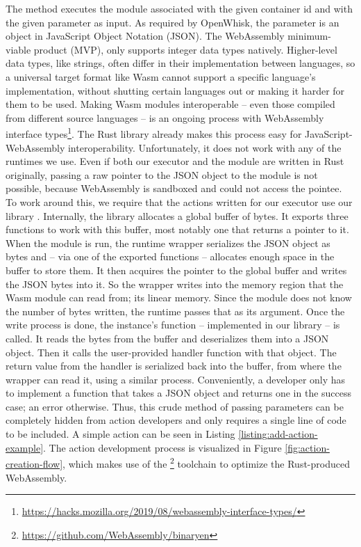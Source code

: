 The  method executes the module associated with the given container id and with the given parameter as input. As required by OpenWhisk, the parameter is an object in JavaScript Object Notation (JSON). The WebAssembly minimum-viable product (MVP), only supports integer data types natively. Higher-level data types, like strings, often differ in their implementation between languages, so a universal target format like Wasm cannot support a specific language's implementation, without shutting certain languages out or making it harder for them to be used. Making Wasm modules interoperable -- even those compiled from different source languages -- is an ongoing process with WebAssembly interface types\footnote{\url{https://hacks.mozilla.org/2019/08/webassembly-interface-types/}}. The  Rust library already makes this process easy for JavaScript-WebAssembly interoperability. Unfortunately, it does not work with any of the runtimes we use. Even if both our executor and the module are written in Rust originally, passing a raw pointer to the JSON object to the module is not possible, because WebAssembly is sandboxed and could not access the pointee. To work around this, we require that the actions written for our executor use our library . Internally, the library allocates a global buffer of bytes. It exports three functions to work with this buffer, most notably one that returns a pointer to it. When the module is run, the runtime wrapper serializes the JSON object as bytes and -- via one of the exported functions -- allocates enough space in the buffer to store them. It then acquires the pointer to the global buffer and writes the JSON bytes into it. So the wrapper writes into the memory region that the Wasm module can read from; its linear memory. Since the module does not know the number of bytes written, the runtime passes that as its  argument.
Once the write process is done, the instance's  function -- implemented in our library -- is called. It reads the  bytes from the buffer and deserializes them into a JSON object. Then it calls the user-provided handler function with that object. The return value from the handler is serialized back into the buffer, from where the wrapper can read it, using a similar process.
Conveniently, a developer only has to implement a function that takes a JSON object and returns one in the success case; an error otherwise. Thus, this crude method of passing parameters can be completely hidden from action developers and only requires a single line of code to be included. A simple action can be seen in Listing \ref{listing:add-action-example}. The action development process is visualized in Figure \ref{fig:action-creation-flow}, which makes use of the \footnote{\url{https://github.com/WebAssembly/binaryen}} toolchain to optimize the Rust-produced WebAssembly.
